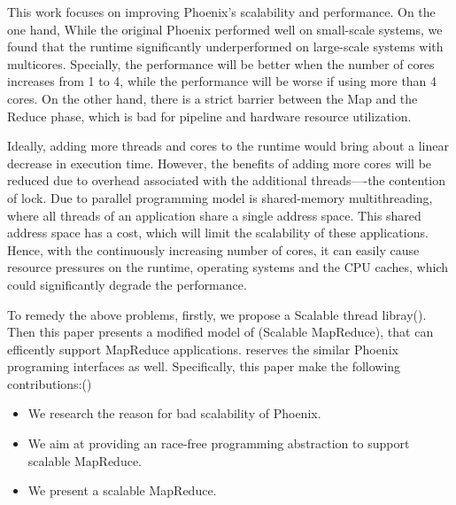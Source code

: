 This work focuses on improving Phoenix\cite{ranger2007phoenix}'s scalability and performance.
On the one hand, 
While the original Phoenix performed well on small-scale systems,
we found that the runtime significantly underperformed on large-scale systems with multicores.
Specially, the performance will be better 
when the number of cores increases from 1 to 4, 
while the performance will be worse if using more than 4 cores. 
On the other hand,
there is a strict barrier between the Map and the
Reduce phase, which is bad for pipeline and hardware resource utilization.


Ideally, adding more threads and cores to the runtime
would bring about a linear decrease in execution time.
However, the benefits of adding more
cores will be reduced due to overhead associated with the
additional threads----the contention of lock.
Due to parallel programming model is shared-memory multithreading, 
where all threads of an application share a single address space. 
This shared address space has a
cost, which will limit the scalability of these applications. 
Hence, with the continuously increasing
number of cores, it can easily cause resource pressures on the
runtime, operating systems and the CPU caches, 
which could significantly degrade the performance. 


To remedy the above problems, 
firstly, we propose a Scalable thread libray(\myth).
Then this paper presents a modified model of \myds(Scalable MapReduce), 
that can efficently support MapReduce applications.
\myds reserves the similar Phoenix programing interfaces as well.
Specifically, this paper make the following contributions:()
\begin{itemize}
  \item We research the reason for bad scalability of Phoenix.
  \item We aim at providing an race-free programming abstraction to
support scalable MapReduce.
  \item We present a scalable MapReduce.
\end{itemize}

